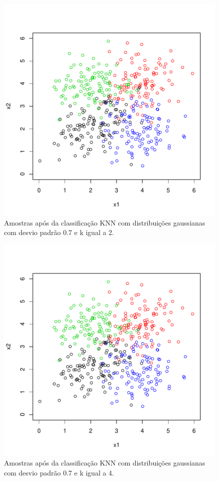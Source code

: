 \documentclass[12pt]{article}
\begin{document}
\begin{figure}[h]
\centering
\includegraphics{knn-019}
\caption{Amostras após da classificação KNN com distribuições gaussianas com desvio padrão 0.7 e k igual a 2.}
\label{sd_0.7}
\end{figure}

\begin{figure}[h]
\centering
\includegraphics{knn-020}
\caption{Amostras após da classificação KNN com distribuições gaussianas com desvio padrão 0.7 e k igual a 4.}
\label{sd_0.7}
\end{figure}
\end{document}

